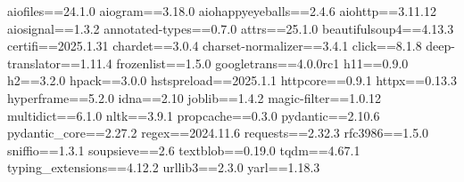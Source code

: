 aiofiles==24.1.0
aiogram==3.18.0
aiohappyeyeballs==2.4.6
aiohttp==3.11.12
aiosignal==1.3.2
annotated-types==0.7.0
attrs==25.1.0
beautifulsoup4==4.13.3
certifi==2025.1.31
chardet==3.0.4
charset-normalizer==3.4.1
click==8.1.8
deep-translator==1.11.4
frozenlist==1.5.0
googletrans==4.0.0rc1
h11==0.9.0
h2==3.2.0
hpack==3.0.0
hstspreload==2025.1.1
httpcore==0.9.1
httpx==0.13.3
hyperframe==5.2.0
idna==2.10
joblib==1.4.2
magic-filter==1.0.12
multidict==6.1.0
nltk==3.9.1
propcache==0.3.0
pydantic==2.10.6
pydantic_core==2.27.2
regex==2024.11.6
requests==2.32.3
rfc3986==1.5.0
sniffio==1.3.1
soupsieve==2.6
textblob==0.19.0
tqdm==4.67.1
typing_extensions==4.12.2
urllib3==2.3.0
yarl==1.18.3
